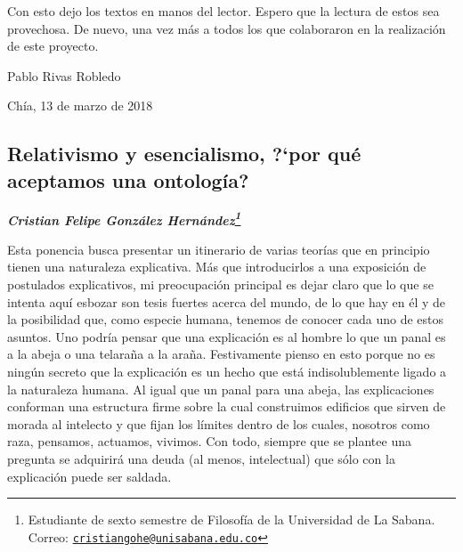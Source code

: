 \documentclass[]{book}
\newcommand{\autor}[1]{            %
  \begin{center}                   %
    \vspace*{-3.5em}               %
    \textbf{\textit{\large #1}}    %
    \vspace*{+4em}                 %
  \end{center}
}
\begin{document}
Con esto dejo los textos en manos del lector. Espero que la lectura de
estos sea provechosa. De nuevo, una vez más a todos los que colaboraron
en la realización de este proyecto.

\begin{flushright}
	Pablo Rivas Robledo

Chía, 13 de marzo de 2018
\end{flushright}




\begin{refsection}
\chapter{\texorpdfstring{\textbf{Relativismo y esencialismo, ?`por qué
aceptamos una
ontología?}}{Relativismo y esencialismo, ?`por qué aceptamos una ontología?}}\label{relativismo-y-esencialismo-por-quuxe9-aceptamos-una-ontologuxeda}

\autor{Cristian Felipe González Hernández\footnote{Estudiante de sexto
  semestre de Filosofía de la Universidad de La Sabana. Correo:
  \href{mailto:cristiangohe@unisabana.edu.co}{\nolinkurl{cristiangohe@unisabana.edu.co}}}}

Esta ponencia busca presentar un itinerario de varias teorías que en
principio tienen una naturaleza explicativa. Más que introducirlos a una
exposición de postulados explicativos, mi preocupación principal es
dejar claro que lo que se intenta aquí esbozar son tesis fuertes acerca
del mundo, de lo que hay en él y de la posibilidad que, como especie
humana, tenemos de conocer cada uno de estos asuntos. Uno podría pensar
que una explicación es al hombre lo que un panal es a la abeja o una
telaraña a la araña. Festivamente pienso en esto porque no es ningún
secreto que la explicación es un hecho que está indisolublemente ligado
a la naturaleza humana. Al igual que un panal para una abeja, las
explicaciones conforman una estructura firme sobre la cual construimos
edificios que sirven de morada al intelecto y que fijan los límites
dentro de los cuales, nosotros como raza, pensamos, actuamos, vivimos.
Con todo, siempre que se plantee una pregunta se adquirirá una deuda (al
menos, intelectual) que sólo con la explicación puede ser saldada.


\end{refsection}
\end{document}
